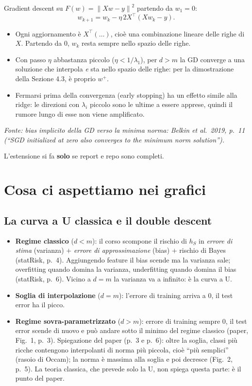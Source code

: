 \documentclass[11pt,a4paper]{article}
\newcommand{\norm}[1]{\left\lVert #1 \right\rVert}
\newcommand{\fonte}[1]{\par\noindent\textit{Fonte: #1}\par\smallskip}
\begin{document}
Gradient descent su $F(w) = \norm{Xw - y}^2$ partendo da $w_1 = 0$:
\[
  w_{k+1} = w_k - \eta\, 2X^\top(Xw_k - y).
\]
\begin{itemize}
  \item Ogni aggiornamento è $X^\top(\dots)$, cioè una combinazione lineare delle righe di $X$. Partendo da $0$,
        $w_k$ resta sempre nello spazio delle righe.
  \item Con passo $\eta$ abbastanza piccolo ($\eta < 1/\lambda_1$), per $d > m$ la GD converge a una soluzione che
        interpola \emph{e} sta nello spazio delle righe: per la dimostrazione della Sezione 4.3, è proprio $w^{+}$.
  \item Fermarsi prima della convergenza (early stopping) ha un effetto simile alla ridge: le direzioni con $\lambda_i$
        piccolo sono le ultime a essere apprese, quindi il rumore lungo di esse non viene amplificato.
\end{itemize}
\fonte{bias implicito della GD verso la minima norma: Belkin et al.\ 2019, p.~11 (``SGD initialized at zero also converges to the minimum norm solution'').}
L'estensione si fa \textbf{solo} se report e repo sono completi.

\section{Cosa ci aspettiamo nei grafici}

\subsection{La curva a U classica e il double descent}
\begin{itemize}
  \item \textbf{Regime classico} ($d < m$): il corso scompone il rischio di $h_S$ in
        \emph{errore di stima} (varianza) $+$ \emph{errore di approssimazione} (bias) $+$ rischio di Bayes
        (statRisk, p.~4). Aggiungendo feature il bias scende ma la varianza sale; overfitting quando domina la varianza,
        underfitting quando domina il bias (statRisk, p.~6). Vicino a $d = m$ la varianza va a infinito: è la curva a U.
  \item \textbf{Soglia di interpolazione} ($d = m$): l'errore di training arriva a $0$, il test error ha il picco.
  \item \textbf{Regime sovra-parametrizzato} ($d > m$): errore di training sempre $0$, il test error scende di nuovo e
        può andare sotto il minimo del regime classico (paper, Fig.~1, p.~3). Spiegazione del paper (p.~3 e p.~6): oltre la soglia, classi più ricche contengono interpolanti di norma più piccola, cioè ``più semplici'' (rasoio di Occam); la norma è massima alla soglia e poi decresce (Fig.~2, p.~5). La teoria classica, che prevede solo la U,
        non spiega questa parte: è il punto del paper.
\end{itemize}
\end{document}

